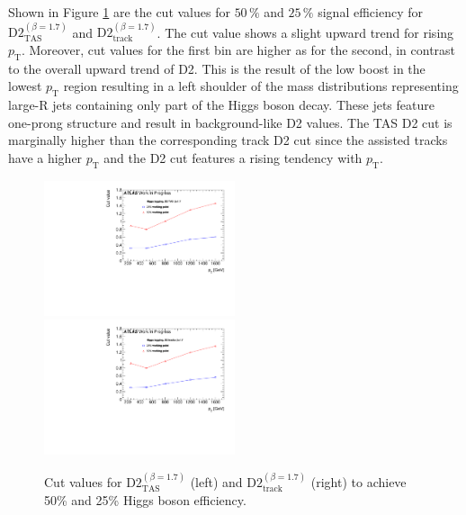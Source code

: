 Shown in Figure \ref{fig:higgs_cut} are the cut values for $50\,\%$ and $25\,\%$ signal efficiency for $\text{D2}_{\text{TAS}}^{(\beta=1.7)}$ and $\text{D2}_{\text{track}}^{(\beta=1.7)}$. The cut value shows a slight upward trend for rising $p_{\mathrm{T}}$. Moreover, cut values for the first bin are higher as for the second, in contrast to the overall upward trend of D2. This is the result of the low boost in the lowest $p_{\mathrm{T}}$ region resulting in a left shoulder of the mass distributions representing large-R jets containing only part of the Higgs boson decay. These jets feature one-prong structure and result in background-like D2 values. The TAS D2 cut is marginally higher than the corresponding track D2 cut since the assisted tracks have a higher $p_{\mathrm{T}}$ and the D2 cut features a rising tendency with $p_{\mathrm{T}}$. 
\begin{figure}
\includegraphics[width=0.5\textwidth]{sascha_input/plots/Higgs/cut_value/d2_tas17.pdf} \hspace{1mm}
\includegraphics[width=0.5\textwidth]{sascha_input/plots/Higgs/cut_value/d2_tracks17.pdf}
\caption{\footnotesize{Cut values for $\text{D2}_{\text{TAS}}^{(\beta=1.7)}$ (left) and $\text{D2}_{\text{track}}^{(\beta=1.7)}$ (right) to achieve 50\% and 25\% Higgs boson efficiency.}}\label{fig:higgs_cut}
\end{figure}


